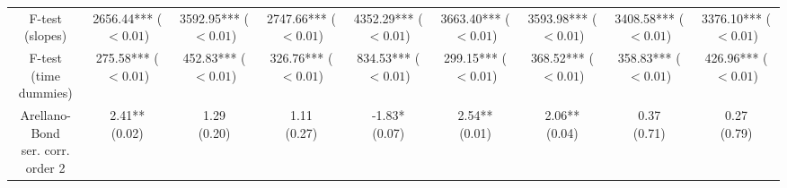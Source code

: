 \begin{tabular}{ccccccccc}
                   \makecell{F-test\\(slopes)} &  \makecell{2656.44***\\($< 0.01$)} &  \makecell{3592.95***\\($< 0.01$)} &  \makecell{2747.66***\\($< 0.01$)} &  \makecell{4352.29***\\($< 0.01$)} &  \makecell{3663.40***\\($< 0.01$)} &  \makecell{3593.98***\\($< 0.01$)} &  \makecell{3408.58***\\($< 0.01$)} &  \makecell{3376.10***\\($< 0.01$)} \\
             \makecell{F-test\\(time dummies)} &   \makecell{275.58***\\($< 0.01$)} &   \makecell{452.83***\\($< 0.01$)} &   \makecell{326.76***\\($< 0.01$)} &   \makecell{834.53***\\($< 0.01$)} &   \makecell{299.15***\\($< 0.01$)} &   \makecell{368.52***\\($< 0.01$)} &   \makecell{358.83***\\($< 0.01$)} &   \makecell{426.96***\\($< 0.01$)} \\
 \makecell{Arellano-Bond\\ser. corr.  order 2} &          \makecell{2.41**\\(0.02)} &            \makecell{1.29\\(0.20)} &            \makecell{1.11\\(0.27)} &          \makecell{-1.83*\\(0.07)} &          \makecell{2.54**\\(0.01)} &          \makecell{2.06**\\(0.04)} &            \makecell{0.37\\(0.71)} &            \makecell{0.27\\(0.79)} \\
\bottomrule
\end{tabular}
